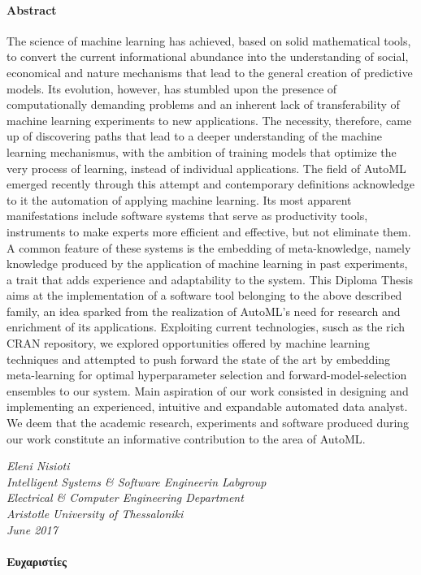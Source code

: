 {	\paragraph{Abstract}
	The science of machine learning has achieved, based on solid mathematical tools, to convert the current informational abundance into the under\-standing of social, economical and nature mechanisms that lead to the general creation of predictive models. Its evolution, however, has stumbled upon  the presence of computationally demanding problems and an inherent lack of transferability of machine learning experiments to new applications. The necessity, therefore, came up of discovering paths that lead to a deeper understanding of the machine learning mecha\-nismus, with the ambition of training models that optimize the very process of learning, instead of individual applications. The field of \gls{AutoML} emerged recently through this attempt and contempo\-rary definitions acknowledge to it the automation of applying machine learning. Its most apparent manifestations  include software systems that serve as productivity tools, instruments to make experts more efficient and effective, but not eliminate them. A common feature of these systems is the embedding of meta-knowledge, namely knowledge produced by the application of machine learning in past experi\-ments, a trait that adds experience and adaptability to the system. This Diploma Thesis aims at the implementation of a software tool belonging to the above described family, an idea sparked from the realization of \gls{AutoML}'s need for research and enrichment of its applications. Exploiting current technologies, susch as the rich CRAN repository, we explored opportunities offered by machine learning techniques and attempted to push forward the state of the art by embedding meta-learning for optimal hyperparameter selection and forward-model-selection ensembles to our system. Main aspiration of our work consisted in designing and implementing an experien\-ced, intuitive and expandable automated data analyst. We deem that the acade\-mic research, experiments and software produced during our work constitute an informa\-tive contribu\-tion to the area of \gls{AutoML}.       
	
	\vspace{2cm}
	
	\begin{flushleft}
		\textit{Eleni Nisioti \\
		Intelligent Systems \& Software Engineerin Labgroup\\
		Electrical \& Computer Engineering Department\\
		Aristotle University of Thessaloniki\\
		June 2017}
	\end{flushleft}
	
	\newpage
	\paragraph{Ευχαριστίες}
	\newpage
}


